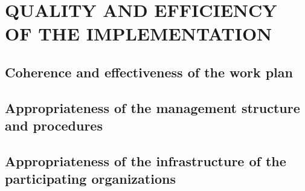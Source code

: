 \documentclass[11pt,a4paper]{article}
\begin{document}
\section{QUALITY AND EFFICIENCY OF THE IMPLEMENTATION}
%
\subsection{Coherence and effectiveness of the work plan}
\label{sec:coherence}

%

\processdelayedfloats
\FloatBarrier

\subsection{Appropriateness of the management structure and procedures}

\processdelayedfloats
%
\subsection{Appropriateness of the infrastructure of the participating organizations}

\processdelayedfloats

\FloatBarrier
%
%
\clearpage


%
%
\end{document}
